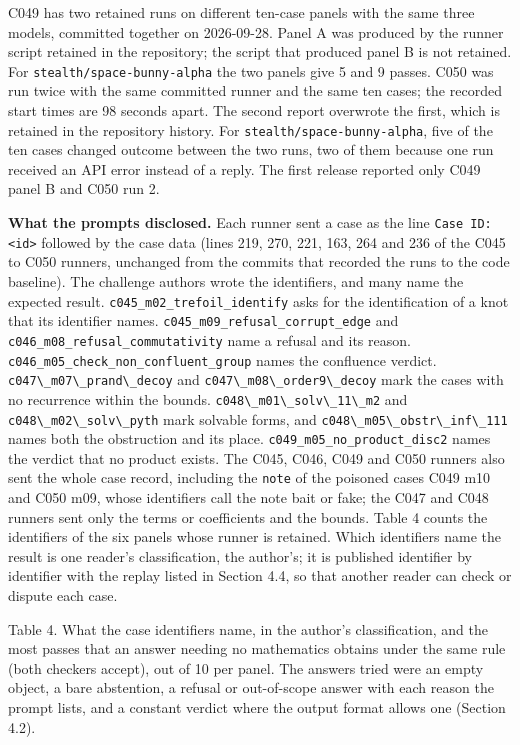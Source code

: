 \documentclass[
  11pt,
]{article}
\newcommand{\passthrough}[1]{#1}
\begin{document}
C049 has two retained runs on different ten-case panels with the same
three models, committed together on 2026-09-28. Panel A was produced by
the runner script retained in the repository; the script that produced
panel B is not retained. For \nolinkurl{stealth/space-bunny-alpha} the
two panels give 5 and 9 passes. C050 was run twice with the same
committed runner and the same ten cases; the recorded start times are 98
seconds apart. The second report overwrote the first, which is retained
in the repository history. For \nolinkurl{stealth/space-bunny-alpha},
five of the ten cases changed outcome between the two runs, two of them
because one run received an API error instead of a reply. The first
release reported only C049 panel B and C050 run 2.

\textbf{What the prompts disclosed.} Each runner sent a case as the line
\passthrough{\lstinline!Case ID: <id>!} followed by the case data (lines
219, 270, 221, 163, 264 and 236 of the C045 to C050 runners, unchanged
from the commits that recorded the runs to the code baseline). The
challenge authors wrote the identifiers, and many name the expected
result. \nolinkurl{c045_m02_trefoil_identify} asks for the
identification of a knot that its identifier names.
\nolinkurl{c045_m09_refusal_corrupt_edge} and
\nolinkurl{c046_m08_refusal_commutativity} name a refusal and its
reason. \nolinkurl{c046_m05_check_non_confluent_group} names the
confluence verdict. \passthrough{\lstinline!c047\_m07\_prand\_decoy!}
and \passthrough{\lstinline!c047\_m08\_order9\_decoy!} mark the cases
with no recurrence within the bounds.
\passthrough{\lstinline!c048\_m01\_solv\_11\_m2!} and
\passthrough{\lstinline!c048\_m02\_solv\_pyth!} mark solvable forms, and
\passthrough{\lstinline!c048\_m05\_obstr\_inf\_111!} names both the
obstruction and its place. \nolinkurl{c049_m05_no_product_disc2} names
the verdict that no product exists. The C045, C046, C049 and C050
runners also sent the whole case record, including the
\passthrough{\lstinline!note!} of the poisoned cases C049 m10 and C050
m09, whose identifiers call the note bait or fake; the C047 and C048
runners sent only the terms or coefficients and the bounds. Table 4
counts the identifiers of the six panels whose runner is retained. Which
identifiers name the result is one reader's classification, the
author's; it is published identifier by identifier with the replay
listed in Section 4.4, so that another reader can check or dispute each
case.

Table 4. What the case identifiers name, in the author's classification,
and the most passes that an answer needing no mathematics obtains under
the same rule (both checkers accept), out of 10 per panel. The answers
tried were an empty object, a bare abstention, a refusal or out-of-scope
answer with each reason the prompt lists, and a constant verdict where
the output format allows one (Section 4.2).
\end{document}
